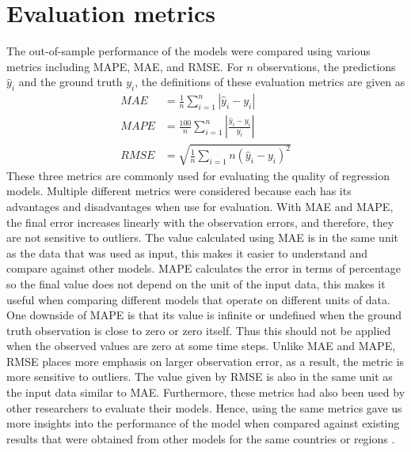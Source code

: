 \section{Evaluation metrics}
\label{sec:methodologies-evaluation-metrics}

The out-of-sample performance of the models were compared using various metrics including \gls{MAPE}, \gls{MAE}, and \gls{RMSE}. For $n$ observations, the predictions $\hat{y}_i$ and the ground truth $y_i$, the definitions of these evaluation metrics are given as
\begin{equation}
    \begin{aligned}
        MAE &= \frac{1}{n} \sum_{i=1}^n \left| \hat{y}_i - y_i \right| \\
        MAPE &= \frac{100}{n} \sum_{i=1}^n \left| \frac{\hat{y}_i - y_i}{y_i} \right| \\
        RMSE &= \sqrt{\frac{1}{n} \sum_{i=1}{n} (\hat{y}_i - y_i)^2}
    \end{aligned}
\end{equation}
These three metrics are commonly used for evaluating the quality of regression models.
Multiple different metrics were considered because each has its advantages and disadvantages when use for evaluation.
With \gls{MAE} and \gls{MAPE}, the final error increases linearly with the observation errors, and therefore, they are not sensitive to outliers.
The value calculated using \gls{MAE} is in the same unit as the data that was used as input, this makes it easier to understand and compare against other models.
\gls{MAPE} calculates the error in terms of percentage so the final value does not depend on the unit of the input data, this makes it useful when comparing different models that operate on different units of data.
One downside of \gls{MAPE} is that its value is infinite or undefined when the ground truth observation is close to zero or zero itself.
Thus this should not be applied when the observed values are zero at some time steps.
Unlike \gls{MAE} and \gls{MAPE}, \gls{RMSE} places more emphasis on larger observation error, as a result, the metric is more sensitive to outliers.
The value given by \gls{RMSE} is also in the same unit as the input data similar to \gls{MAE}.
Furthermore, these metrics had also been used by other researchers to evaluate their models.
Hence, using the same metrics gave us more insights into the performance of the model when compared against existing results that were obtained from other models for the same countries or regions \cite{rayEnsembleForecastsCoronavirus2020, ihmecovid-19forecastingteamModelingCOVID19Scenarios2021,arikInterpretableSequenceLearning}.
